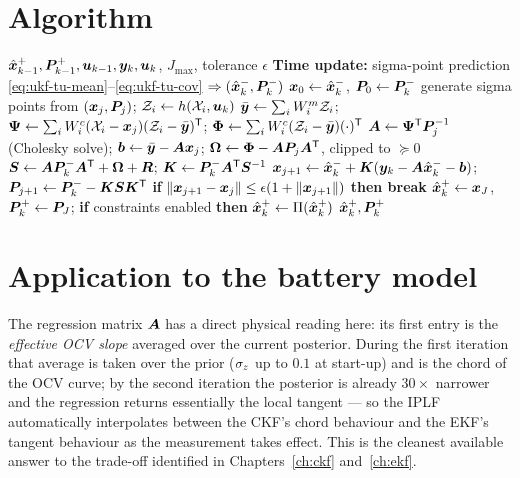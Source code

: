 \section{Algorithm}
\begin{algorithm}[H]
\caption{IPLF --- one sampling period}
\begin{algorithmic}[1]
\Require $\hat{\bm{x}}^{+}_{k-1},\bm{P}^{+}_{k-1},\bm{u}_{k-1},\bm{y}_k,\bm{u}_k$, $J_{\max}$, tolerance $\epsilon$
\State \textbf{Time update:} sigma-point prediction \eqref{eq:ukf-tu-mean}--\eqref{eq:ukf-tu-cov} $\Rightarrow (\hat{\bm{x}}^{-}_k,\bm{P}^{-}_k)$
\State $\bm{x}_0\gets\hat{\bm{x}}^{-}_k$, $\bm{P}_0\gets\bm{P}^{-}_k$
  \State generate sigma points from $(\bm{x}_j,\bm{P}_j)$; $\mathcal{Z}_i\gets h(\mathcal{X}_i,\bm{u}_k)$
  \State $\bar{\bm{y}}\gets\sum_i W^m_i\mathcal{Z}_i$;\;
         $\bm\Psi\gets\sum_i W^c_i(\mathcal{X}_i-\bm{x}_j)(\mathcal{Z}_i-\bar{\bm{y}})^{\mathsf{T}}$;\;
         $\bm\Phi\gets\sum_i W^c_i(\mathcal{Z}_i-\bar{\bm{y}})(\cdot)^{\mathsf{T}}$
  \State $\bm{A}\gets\bm\Psi^{\mathsf{T}}\bm{P}_j^{-1}$ (Cholesky solve);\; $\bm b\gets\bar{\bm{y}}-\bm{A}\bm{x}_j$;\;
         $\bm\Omega\gets\bm\Phi-\bm{A}\bm{P}_j\bm{A}^{\mathsf{T}}$, clipped to $\succeq0$
  \State $\bm{S}\gets\bm{A}\bm{P}^{-}_k\bm{A}^{\mathsf{T}}+\bm\Omega+\bm{R}$;\; $\bm{K}\gets\bm{P}^{-}_k\bm{A}^{\mathsf{T}}\bm{S}^{-1}$
  \State $\bm{x}_{j+1}\gets\hat{\bm{x}}^{-}_k+\bm{K}(\bm{y}_k-\bm{A}\hat{\bm{x}}^{-}_k-\bm b)$;\;
         $\bm{P}_{j+1}\gets\bm{P}^{-}_k-\bm{K}\bm{S}\bm{K}^{\mathsf{T}}$
  \State \textbf{if} $\left\lVert \bm{x}_{j+1}-\bm{x}_j \right\rVert\le\epsilon(1+\left\lVert \bm{x}_{j+1} \right\rVert)$ \textbf{then break}
\EndFor
\State $\hat{\bm{x}}^{+}_k\gets\bm{x}_J$, $\bm{P}^{+}_k\gets\bm{P}_J$;
       \textbf{if} constraints enabled \textbf{then} $\hat{\bm{x}}^{+}_k\gets\Pi(\hat{\bm{x}}^{+}_k)$
\Ensure $\hat{\bm{x}}^{+}_k,\bm{P}^{+}_k$
\end{algorithmic}
\end{algorithm}

\section{Application to the battery model}
The regression matrix $\bm{A}$ has a direct physical reading here: its first entry is the
\emph{effective OCV slope} averaged over the current posterior. During the first iteration
that average is taken over the prior ($\sigma_z$ up to $0.1$ at start-up) and is the chord
of the OCV curve; by the second iteration the posterior is already $30\times$ narrower and
the regression returns essentially the local tangent --- so the IPLF automatically interpolates
between the CKF's chord behaviour and the EKF's tangent behaviour as the measurement takes
effect. This is the cleanest available answer to the trade-off identified in
Chapters~\ref{ch:ckf} and~\ref{ch:ekf}.

